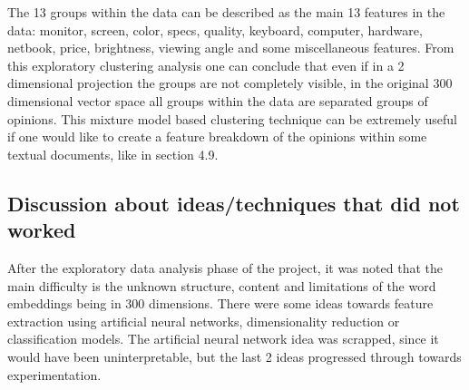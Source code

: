 \documentclass{sig-alternate}
\begin{document}
The 13 groups within the data can be described as the main 13 features in the data: monitor, screen, color, specs, quality, keyboard, computer, hardware, netbook, price, brightness, viewing angle and some miscellaneous features. From this exploratory clustering analysis one can conclude that even if in a 2 dimensional projection the groups are not completely visible, in the original 300 dimensional vector space all groups within the data are separated groups of opinions. This mixture model based clustering technique can be extremely useful if one would like to create a feature breakdown of the opinions within some textual documents, like in section 4.9.

\subsection{Discussion about ideas/techniques that did not worked}
After the exploratory data analysis phase of the project, it was noted that the main difficulty is the unknown structure, content and limitations of the word embeddings being in 300 dimensions. There were some ideas towards feature extraction using artificial neural networks, dimensionality reduction or classification models. The artificial neural network idea was scrapped, since it would have been uninterpretable, but the last 2 ideas progressed through towards experimentation. 
\end{document}
